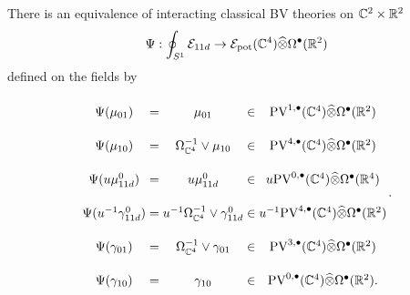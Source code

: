 \documentclass[11pt]{article}
\newcommand\bu{\bullet}
\newcommand\CC{{\mb C}}
\newcommand \RR{{\mb R}}
\def\Hat{\widehat}
\begin{document}
\begin{prop}
There is an equivalence of interacting classical BV theories on $\mathbb{C}^2 \times \mathbb{R}^2$
\[
\Psi : \oint_{S^1} \mc E_{11d} \to \mc E_{\rm pot} (\CC^4) \Hat{\otimes} \Omega^\bu(\mb R^2) 
\] 
defined on the fields by
\[
\arraycolsep=1.4pt\def\arraystretch{2.2}
\begin{array}{cccccccc}
\Psi (\mu_{01}) & = & \mu_{01} & \in & \PV^{1,\bu}(\mb C^4) \Hat{\otimes} \Omega^\bu(\mb R^2) \\
\Psi (\mu_{10}) & = & \Omega^{-1}_{\mb C^4} \vee \mu_{10} & \in & \PV^{4,\bu}(\mb C^4) \Hat{\otimes} \Omega^\bu(\mb R^2) \\ 
\Psi(u \mu^0_{11d}) & = & u \mu^0_{11d} & \in & u \PV^{0,\bu} (\CC^4) \Hat{\otimes} \Omega^\bu (\RR^4) \\ 
\Psi (u^{-1} \gamma_{11d}^0) & = & u^{-1} \Omega^{-1}_{\CC^4} \vee \gamma_{11d}^0 & \in & u^{-1} \PV^{4,\bu}(\CC^4) \Hat{\otimes} \Omega^\bu(\RR^2) \\ \Psi(\gamma_{01}) &  = & \Omega^{-1}_{\CC^4} \vee \gamma_{01} & \in & \PV^{3,\bu}(\CC^4) \Hat{\otimes} \Omega^\bu(\RR^2) \\
\Psi (\gamma_{10}) & = & \gamma_{10} & \in & \PV^{0,\bu}(\CC^4) \Hat{\otimes} \Omega^\bu(\RR^2) .
\end{array} .
\]
\end{prop}  


%
%
%
\end{document}
